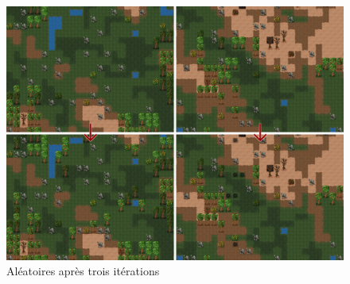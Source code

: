 \documentclass[a4paper]{memoir}
\begin{document}
			\begin{figure}
				\begin{center}
					\includegraphics[scale=0.2]{img/Aleatoire.png}
				\end{center}
				\label{fig:aleatoire}
				\caption{Aléatoires après trois itérations}
			\end{figure}
\end{document}
